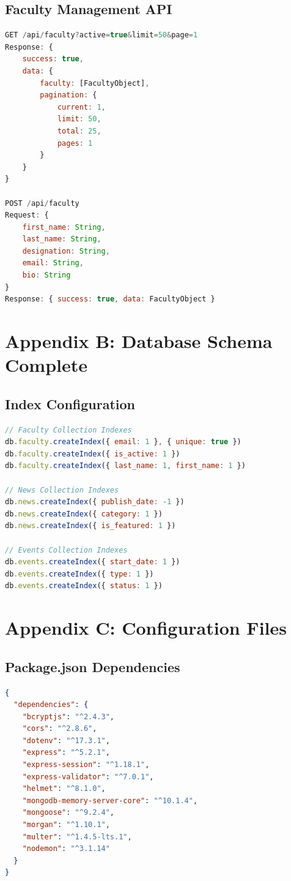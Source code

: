 \documentclass[12pt,a4paper]{report}
\begin{document}
\subsection{Faculty Management API}
\begin{lstlisting}[language=JavaScript, caption=Faculty API Details]
GET /api/faculty?active=true&limit=50&page=1
Response: {
    success: true,
    data: {
        faculty: [FacultyObject],
        pagination: {
            current: 1,
            limit: 50,
            total: 25,
            pages: 1
        }
    }
}

POST /api/faculty
Request: {
    first_name: String,
    last_name: String,
    designation: String,
    email: String,
    bio: String
}
Response: { success: true, data: FacultyObject }
\end{lstlisting}

\section{Appendix B: Database Schema Complete}
\subsection{Index Configuration}
\begin{lstlisting}[language=JavaScript, caption=Database Indexes]
// Faculty Collection Indexes
db.faculty.createIndex({ email: 1 }, { unique: true })
db.faculty.createIndex({ is_active: 1 })
db.faculty.createIndex({ last_name: 1, first_name: 1 })

// News Collection Indexes
db.news.createIndex({ publish_date: -1 })
db.news.createIndex({ category: 1 })
db.news.createIndex({ is_featured: 1 })

// Events Collection Indexes
db.events.createIndex({ start_date: 1 })
db.events.createIndex({ type: 1 })
db.events.createIndex({ status: 1 })
\end{lstlisting}

\section{Appendix C: Configuration Files}
\subsection{Package.json Dependencies}
\begin{lstlisting}[language=JSON, caption=Backend Dependencies]
{
  "dependencies": {
    "bcryptjs": "^2.4.3",
    "cors": "^2.8.6",
    "dotenv": "^17.3.1",
    "express": "^5.2.1",
    "express-session": "^1.18.1",
    "express-validator": "^7.0.1",
    "helmet": "^8.1.0",
    "mongodb-memory-server-core": "^10.1.4",
    "mongoose": "^9.2.4",
    "morgan": "^1.10.1",
    "multer": "^1.4.5-lts.1",
    "nodemon": "^3.1.14"
  }
}
\end{lstlisting}
\end{document}
